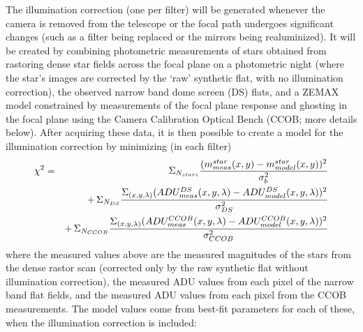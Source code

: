\documentclass[12pt,preprint]{aastex}
\begin{document}
The illumination correction (one per filter) will be generated
whenever the camera is removed from the telescope or the focal path
undergoes significant changes (such as a filter being replaced or the
mirrors being realuminized). It will be created by combining
photometric measurements of stars obtained from rastoring dense star
fields across the focal plane on a photometric night (where the star's
images are corrected by the `raw' synthetic flat, with no illumination
correction), the observed narrow band dome screen (DS) flats, and a
ZEMAX model constrained by measurements of the focal plane response
and ghosting in the focal plane using the Camera Calibration Optical
Bench (CCOB; more details below). After acquiring these data, it is then possible to
create a model for the illumination correction by minimizing (in each
filter)
\begin{eqnarray}
 \chi^2 & = & \Sigma_{N_{stars}} { (m^{star}_{meas}(x,y) - m^{star}_{model}(x,y))^2
\over \sigma_b^2}  \\
  & & +\, \Sigma_{N_{DS}} { \Sigma_{(x,y,\lambda)}
    (ADU^{DS}_{meas}(x,y,\lambda) - ADU^{DS}_{ model}(x,y,\lambda))^2 \over
    \sigma_{DS}^2 }  \nonumber  \\
 & & +\,  \Sigma_{N_{CCOB}} { \Sigma_{(x,y,\lambda)}
   (ADU^{CCOB}_{meas}(x,y,\lambda) - ADU^{CCOB}_{model}(x,y,\lambda))^2 \over
   \sigma_{CCOB}^2 }   \nonumber
\end{eqnarray}
where the measured values above are the measured magnitudes of the stars
from the dense rastor scan (corrected only by the raw synthetic flat
without illumination correction), the measured ADU values from each pixel of the narrow band
flat fields, and the measured ADU values from each pixel from the CCOB
measurements. The model values come from best-fit parameters for each
of these, when the illumination correction is included: 
\end{document}
